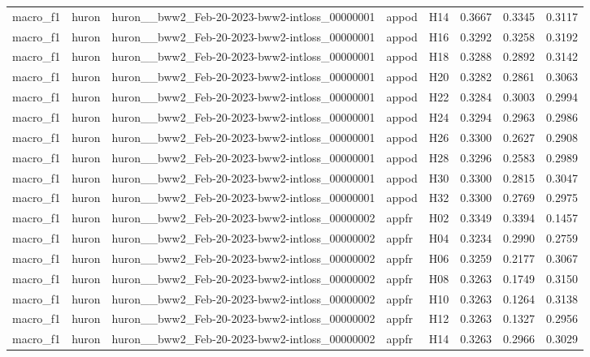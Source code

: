 \begin{table}[tbp]
\begin{tabular}{lllllrrr}
macro\_f1 & huron & huron\_\_bww2\_Feb-20-2023-bww2-intloss\_00000001 & appod & H14 & 0.3667 & 0.3345 & 0.3117 \\
macro\_f1 & huron & huron\_\_bww2\_Feb-20-2023-bww2-intloss\_00000001 & appod & H16 & 0.3292 & 0.3258 & 0.3192 \\
macro\_f1 & huron & huron\_\_bww2\_Feb-20-2023-bww2-intloss\_00000001 & appod & H18 & 0.3288 & 0.2892 & 0.3142 \\
macro\_f1 & huron & huron\_\_bww2\_Feb-20-2023-bww2-intloss\_00000001 & appod & H20 & 0.3282 & 0.2861 & 0.3063 \\
macro\_f1 & huron & huron\_\_bww2\_Feb-20-2023-bww2-intloss\_00000001 & appod & H22 & 0.3284 & 0.3003 & 0.2994 \\
macro\_f1 & huron & huron\_\_bww2\_Feb-20-2023-bww2-intloss\_00000001 & appod & H24 & 0.3294 & 0.2963 & 0.2986 \\
macro\_f1 & huron & huron\_\_bww2\_Feb-20-2023-bww2-intloss\_00000001 & appod & H26 & 0.3300 & 0.2627 & 0.2908 \\
macro\_f1 & huron & huron\_\_bww2\_Feb-20-2023-bww2-intloss\_00000001 & appod & H28 & 0.3296 & 0.2583 & 0.2989 \\
macro\_f1 & huron & huron\_\_bww2\_Feb-20-2023-bww2-intloss\_00000001 & appod & H30 & 0.3300 & 0.2815 & 0.3047 \\
macro\_f1 & huron & huron\_\_bww2\_Feb-20-2023-bww2-intloss\_00000001 & appod & H32 & 0.3300 & 0.2769 & 0.2975 \\
macro\_f1 & huron & huron\_\_bww2\_Feb-20-2023-bww2-intloss\_00000002 & appfr & H02 & 0.3349 & 0.3394 & 0.1457 \\
macro\_f1 & huron & huron\_\_bww2\_Feb-20-2023-bww2-intloss\_00000002 & appfr & H04 & 0.3234 & 0.2990 & 0.2759 \\
macro\_f1 & huron & huron\_\_bww2\_Feb-20-2023-bww2-intloss\_00000002 & appfr & H06 & 0.3259 & 0.2177 & 0.3067 \\
macro\_f1 & huron & huron\_\_bww2\_Feb-20-2023-bww2-intloss\_00000002 & appfr & H08 & 0.3263 & 0.1749 & 0.3150 \\
macro\_f1 & huron & huron\_\_bww2\_Feb-20-2023-bww2-intloss\_00000002 & appfr & H10 & 0.3263 & 0.1264 & 0.3138 \\
macro\_f1 & huron & huron\_\_bww2\_Feb-20-2023-bww2-intloss\_00000002 & appfr & H12 & 0.3263 & 0.1327 & 0.2956 \\
macro\_f1 & huron & huron\_\_bww2\_Feb-20-2023-bww2-intloss\_00000002 & appfr & H14 & 0.3263 & 0.2966 & 0.3029 \\

\end{tabular}
\end{table}
